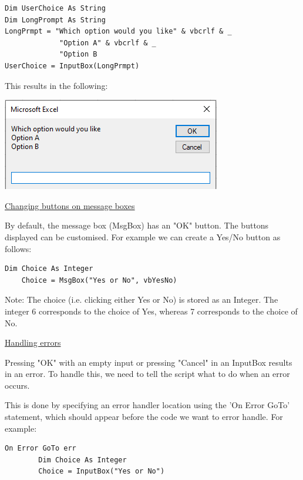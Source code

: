 \documentclass[8pt]{extarticle}
\begin{document}
\begin{multicols}{3}
\begin{lstlisting}[style=vba]
Dim UserChoice As String
Dim LongPrompt As String
LongPrmpt = "Which option would you like" & vbcrlf & _
             "Option A" & vbcrlf & _
             "Option B
UserChoice = InputBox(LongPrmpt)   
\end{lstlisting}
This results in the following:
\begin{center}
    \includegraphics[width=0.75\columnwidth]{images/MultiLinePrompt.png}
\end{center}

\begin{center}
    \underline{Changing buttons on message boxes}
\end{center}

By default, the message box (MsgBox) has an "OK" button. The buttons displayed can be customised. For example we can create a Yes/No button as follows:

\begin{lstlisting}[style=vba]
    Dim Choice As Integer
    Choice = MsgBox("Yes or No", vbYesNo) 
\end{lstlisting}

Note: The choice (i.e. clicking either Yes or No) is stored as an Integer. The integer 6 corresponds to the choice of Yes, whereas 7 corresponds to the choice of No.

\begin{center}
    \underline{Handling errors}
\end{center}

Pressing "OK" with an empty input or pressing "Cancel" in an InputBox results in an error. To handle this, we need to tell the script what to do when an error occurs. 

This is done by specifying an error handler location using the 'On Error GoTo' statement, which should appear before the code we want to error handle. For example:

\begin{lstlisting}[style=vba]
        On Error GoTo err
        Dim Choice As Integer
        Choice = InputBox("Yes or No")
        

\end{lstlisting}
\end{multicols}
\end{document}
